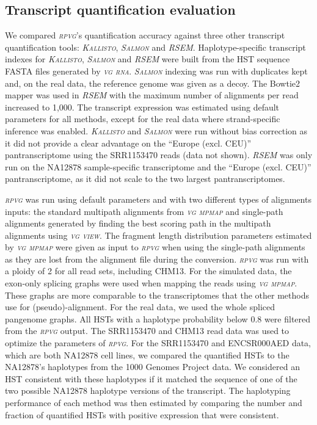 \documentclass[11pt]{ucthesis}
\newcommand{\tool}[1]{\emph{\textsc{#1}}}
\begin{document}
\subsection{Transcript quantification evaluation}

We compared \tool{rpvg}'s quantification accuracy against three other transcript quantification tools: \tool{Kallisto}, \tool{Salmon} and \tool{RSEM}. Haplotype-specific transcript indexes for \tool{Kallisto}, \tool{Salmon} and \tool{RSEM} were built from the HST sequence FASTA files generated by \tool{vg rna}. \tool{Salmon} indexing was run with duplicates kept and, on the real data, the reference genome was given as a decoy. The Bowtie2 mapper was used in \tool{RSEM} with the maximum number of alignments per read increased to 1,000. The transcript expression was estimated using default parameters for all methods, except for the real data where strand-specific inference was enabled. \tool{Kallisto} and \tool{Salmon} were run without bias correction as it did not provide a clear advantage on the ``Europe (excl. CEU)'' pantranscriptome using the SRR1153470 reads (data not shown). \tool{RSEM} was only run on the NA12878 sample-specific transcriptome and the ``Europe (excl. CEU)'' pantranscriptome, as it did not scale to the two largest pantranscriptomes. 

\tool{rpvg} was run using default parameters and with two different types of alignments inputs: the standard multipath alignments from \tool{vg mpmap} and single-path alignments generated by finding the best scoring path in the multipath alignments using \tool{vg view}. The fragment length distribution parameters estimated by \tool{vg mpmap} were given as input to \tool{rpvg} when using the single-path alignments as they are lost from the alignment file during the conversion. \tool{rpvg} was run with a ploidy of 2 for all read sets, including CHM13. For the simulated data, the exon-only splicing graphs were used when mapping the reads using \tool{vg mpmap}. These graphs are more comparable to the transcriptomes that the other methods use for (pseudo)-alignment. For the real data, we used the whole spliced pangenome graphs. All HSTs with a haplotype probability below 0.8 were filtered from the \tool{rpvg} output. The SRR1153470 and CHM13 read data was used to optimize the parameters of \tool{rpvg}.  
\newline 
\newline
For the SRR1153470 and ENCSR000AED data, which are both NA12878 cell lines, we compared the quantified HSTs to the NA12878's haplotypes from the 1000 Genomes Project data. We considered an HST consistent with these haplotypes if it matched the sequence of one of the two possible NA12878 haplotype versions of the transcript. The haplotyping performance of each method was then estimated by comparing the number and fraction of quantified HSTs with positive expression that were consistent. 
\end{document}
